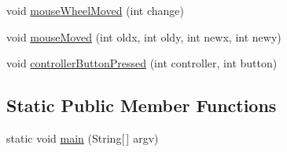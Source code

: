 \begin{DoxyCompactItemize}
\item 
void \mbox{\hyperlink{classorg_1_1newdawn_1_1slick_1_1tests_1_1_input_test_af9fe762d2e11ec43fd4676e7678649bd}{mouse\+Wheel\+Moved}} (int change)
\item 
void \mbox{\hyperlink{classorg_1_1newdawn_1_1slick_1_1tests_1_1_input_test_a21d3311cf60fcac31409926d3c3323b7}{mouse\+Moved}} (int oldx, int oldy, int newx, int newy)
\item 
void \mbox{\hyperlink{classorg_1_1newdawn_1_1slick_1_1tests_1_1_input_test_a7b7b3c980b5b222fbcec4eb5ff5b2590}{controller\+Button\+Pressed}} (int controller, int button)
\end{DoxyCompactItemize}
\subsection*{Static Public Member Functions}
\begin{DoxyCompactItemize}
\item 
static void \mbox{\hyperlink{classorg_1_1newdawn_1_1slick_1_1tests_1_1_input_test_a5b1062b96aedd0e1952daa50bcb8a8f9}{main}} (String\mbox{[}$\,$\mbox{]} argv)
\end{DoxyCompactItemize}

